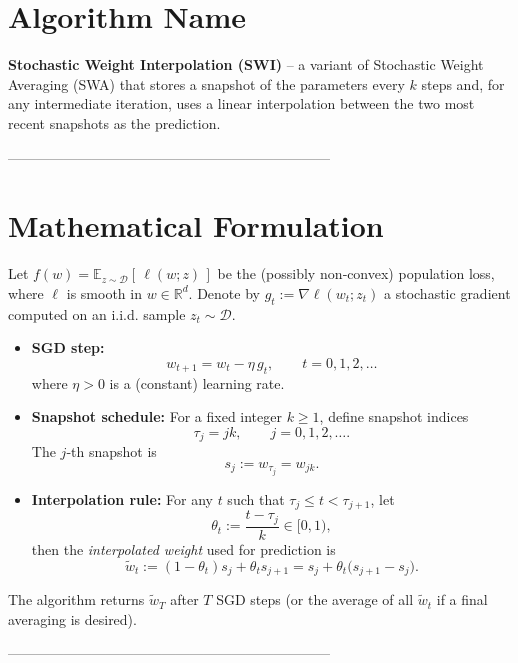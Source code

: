 \documentclass{article}
\newcommand{\E}{\mathbb{E}}
\newcommand{\R}{\mathbb{R}}
\begin{document}
\section*{Algorithm Name}
\textbf{Stochastic Weight Interpolation (SWI)} – a variant of Stochastic Weight Averaging (SWA) that stores a snapshot of the parameters every $k$ steps and, for any intermediate iteration, uses a linear interpolation between the two most recent snapshots as the prediction.

---------------------------------------------------------------------

\section*{Mathematical Formulation}
Let $f(w)=\E_{z\sim\mathcal{D}}[\,\ell(w;z)\,]$ be the (possibly non‑convex) population loss, where $\ell$ is smooth in $w\in\R^{d}$.  
Denote by $g_t:=\nabla\ell(w_t;z_t)$ a stochastic gradient computed on an i.i.d. sample $z_t\sim\mathcal{D}$.

\begin{itemize}
    \item \textbf{SGD step:}
    \[
        w_{t+1}=w_t-\eta\, g_t ,\qquad t=0,1,2,\dots
    \tag{1}
    \]
    where $\eta>0$ is a (constant) learning rate.
    \item \textbf{Snapshot schedule:} For a fixed integer $k\ge 1$, define snapshot indices
    \[
        \tau_j=jk,\qquad j=0,1,2,\dots .
    \]
    The $j$‑th snapshot is
    \[
        s_j:=w_{\tau_j}=w_{jk}.
    \tag{2}
    \]
    \item \textbf{Interpolation rule:} For any $t$ such that $\tau_j\le t<\tau_{j+1}$,
    let 
    \[
        \theta_t:=\frac{t-\tau_j}{k}\in[0,1),
    \]
    then the \emph{interpolated weight} used for prediction is
    \[
        \widetilde w_t:=(1-\theta_t)s_j+\theta_t s_{j+1}
        =s_j+\theta_t\bigl(s_{j+1}-s_j\bigr).
    \tag{3}
    \]
\end{itemize}
The algorithm returns $\widetilde w_T$ after $T$ SGD steps (or the average of all $\widetilde w_t$ if a final averaging is desired).

---------------------------------------------------------------------
\end{document}
